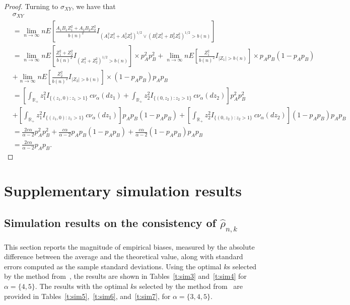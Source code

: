 \documentclass[lineno]{biometrika}
\newcommand \ag{\alpha}
\newcommand \sg{\sigma}
\newcommand\mbR{{\mathbb R}}
\newcommand\lb{\left [}
\newcommand\rb{\right ]}
\begin{document}
\begin{proof}
Turning to $\sg_{XY}$, we have that
\begin{align*}
&\sg_{XY} \\
&= \lim_{n \to \infty} n E \lb  \frac{A_1B_1Z_1^2 + A_2B_2Z_2^2}{b(n)^2} I_{(A_1^2Z_1^2 + A_2^2Z_2^2)^{1/2} \vee (B_1^2Z_1^2 + B_2^2Z_2^2)^{1/2} > b(n)} \rb \\
&= \lim_{n \to \infty} n E \lb  \frac{Z_1^2 + Z_2^2}{b(n)^2} I_{(Z_1^2 + Z_2^2)^{1/2} > b(n)} \rb \times p_A^2p_B^2 +\lim_{n \to \infty} n E \lb  \frac{Z_1^2}{b(n)^2} I_{|Z_1| > b(n)} \rb \times p_Ap_B(1-p_Ap_B) \\
& + \lim_{n \to \infty} n E \lb  \frac{Z_2^2}{b(n)^2} I_{|Z_2|  > b(n)} \rb \times (1-p_Ap_B)p_Ap_B\\
& = \lb \int_{\mbR_+}  z_1^2  I_{ \{(z_1, 0): z_1>1\} } \ c\nu_{\ag}(dz_1) + \int_{\mbR_+}  z_2^2 I_{ \{(0, z_2): z_2>1 \}} \ c\nu_{\ag}(dz_2) \rb p_A^2p_B^2 \\
& + \lb \int_{\mbR_+}  z_1^2  I_{ \{(z_1, 0): z_1>1\} } \ c\nu_{\ag}(dz_1)  \rb p_Ap_B(1-p_Ap_B) + \lb \int_{\mbR_+}  z_2^2  I_{ \{(0, z_2): z_2>1\} } \ c\nu_{\ag}(dz_2)  \rb (1-p_Ap_B)p_Ap_B\\
&= \frac{2c\ag}{\ag-2}p_A^2p_B^2 + \frac{c\ag}{\ag-2}p_Ap_B(1-p_Ap_B) + \frac{c\ag}{\ag-2}(1-p_Ap_B)p_Ap_B\\
&= \frac{2c\ag}{\ag-2}p_Ap_B.
\end{align*}
\end{proof}


\clearpage

\appendixfour
\section{Supplementary simulation results} \label{s:a_sim}

\subsection{Simulation results on the consistency of $\hat{\rho}_{n,k}$} \label{ss:a_sim}

This section reports the magnitude of empirical biases, measured by the absolute difference between the average and the theoretical value, along with standard errors computed as the sample standard deviations. Using the optimal $k$s selected by the method from~\citet{danielsson:Ergun:deHaan:deVries:2016}, the results are shown in Tables~\ref{t:sim3} and~\ref{t:sim4} for $\alpha =  \{4,5\}$. The results with the optimal $k$s selected by the method from~\citet{clauset:shalizi:newman:2009} are provided in  Tables~\ref{t:sim5},~\ref{t:sim6}, and~\ref{t:sim7}, for $\alpha =  \{3,4,5\}$.
\end{document}
